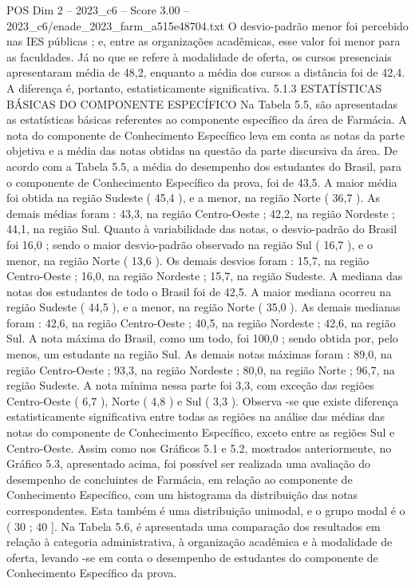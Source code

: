 \begin{textsample}{POS Dim 2 – 2023\_c6 – Score 3.00 – 2023\_c6/enade\_2023\_farm\_a515e48704.txt}
O desvio-padrão menor foi percebido nas IES públicas ; e, entre as organizações acadêmicas, esse valor foi menor para as faculdades.
Já no que se refere à modalidade de oferta, os cursos presenciais apresentaram média de 48,2, enquanto a média dos cursos a distância foi de 42,4.
A diferença é, portanto, estatisticamente significativa. 5.1.3 ESTATÍSTICAS BÁSICAS DO COMPONENTE ESPECÍFICO Na Tabela 5.5, são apresentadas as estatísticas básicas referentes ao componente específico da área de Farmácia.
A nota do componente de Conhecimento Específico leva em conta as notas da parte objetiva e a média das notas obtidas na questão da parte discursiva da área.
De acordo com a Tabela 5.5, a média do desempenho dos estudantes do Brasil, para o componente de Conhecimento Específico da prova, foi de 43,5.
A maior média foi obtida na região Sudeste ( 45,4 ), e a menor, na região Norte ( 36,7 ).
As demais médias foram : 43,3, na região Centro-Oeste ; 42,2, na região Nordeste ; 44,1, na região Sul.
Quanto à variabilidade das notas, o desvio-padrão do Brasil foi 16,0 ; sendo o maior desvio-padrão observado na região Sul ( 16,7 ), e o menor, na região Norte ( 13,6 ).
Os demais desvios foram : 15,7, na região Centro-Oeste ; 16,0, na região Nordeste ; 15,7, na região Sudeste.
A mediana das notas dos estudantes de todo o Brasil foi de 42,5.
A maior mediana ocorreu na região Sudeste ( 44,5 ), e a menor, na região Norte ( 35,0 ).
As demais medianas foram : 42,6, na região Centro-Oeste ; 40,5, na região Nordeste ; 42,6, na região Sul.
A nota máxima do Brasil, como um todo, foi 100,0 ; sendo obtida por, pelo menos, um estudante na região Sul.
As demais notas máximas foram : 89,0, na região Centro-Oeste ; 93,3, na região Nordeste ; 80,0, na região Norte ; 96,7, na região Sudeste.
A nota mínima nessa parte foi 3,3, com exceção das regiões Centro-Oeste ( 6,7 ), Norte ( 4,8 ) e Sul ( 3,3 ).
Observa -se que existe diferença estatisticamente significativa entre todas as regiões na análise das médias das notas do componente de Conhecimento Específico, exceto entre as regiões Sul e Centro-Oeste.
Assim como nos Gráficos 5.1 e 5.2, mostrados anteriormente, no Gráfico 5.3, apresentado acima, foi possível ser realizada uma avaliação do desempenho de concluintes de Farmácia, em relação ao componente de Conhecimento Específico, com um histograma da distribuição das notas correspondentes.
Esta também é uma distribuição unimodal, e o grupo modal é o ( 30 ; 40 ].
Na Tabela 5.6, é apresentada uma comparação dos resultados em relação à categoria administrativa, à organização acadêmica e à modalidade de oferta, levando -se em conta o desempenho de estudantes do componente de Conhecimento Específico da prova.

\end{textsample}
